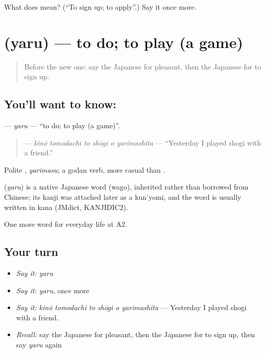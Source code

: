 \begin{tcolorbox}[breakable,colback=teal!4,colframe=teal!35!black,title={Before you move on}]
What does  mean? (\textquotedblleft{}To sign up; to apply\textquotedblright{}.) Say it once more.
\end{tcolorbox}
\section[\texorpdfstring{\ja{やる} (yaru)}{やる (yaru)}]{ (yaru) — to do; to play (a game)}

\label{lesson:JA-C241-yaru}



\begin{quote}
Before the new one: say the Japanese for pleasant, then the Japanese for to sign up.
\end{quote}

\subsection*{You'll want to know: }
\textbf{} — \emph{yaru} — \textquotedblleft{}to do; to play (a game)\textquotedblright{}.

\begin{quote}
\textbf{   } — \emph{kinō tomodachi to shōgi o yarimashita} — \textquotedblleft{}Yesterday I played shogi with a friend.\textquotedblright{}
\end{quote}

Polite \textbf{}, \emph{yarimasu}; a godan verb, more casual than \textbf{}.

\begin{cousinweb}
\textbf{} (\emph{yaru}) is a native Japanese word (wago), inherited rather than borrowed from Chinese; its kanji was attached later as a kun'yomi, and the word is usually written in kana (JMdict, KANJIDIC2).
\end{cousinweb}

\begin{grammarlens}[title={What you've built}]
One more word for everyday life at A2.
\end{grammarlens}

\subsection*{Your turn}
\begin{itemize}
\raggedright
  \item \emph{Say it:} \emph{yaru}
  \item \emph{Say it:} \emph{yaru}, once more
  \item \emph{Say it:} \emph{kinō tomodachi to shōgi o yarimashita} — Yesterday I played shogi with a friend.
  \item \emph{Recall:} say the Japanese for pleasant, then the Japanese for to sign up, then say \emph{yaru} again
\end{itemize}

